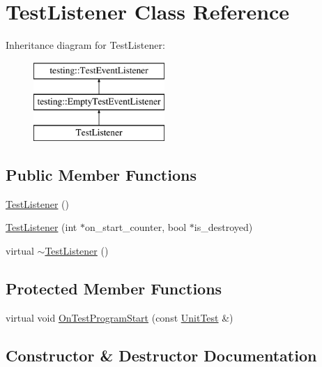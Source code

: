 \hypertarget{class_test_listener}{}\section{Test\+Listener Class Reference}
\label{class_test_listener}
Inheritance diagram for Test\+Listener\+:\begin{figure}[H]
\begin{center}
\leavevmode
\includegraphics[height=3.000000cm]{class_test_listener}
\end{center}
\end{figure}
\subsection*{Public Member Functions}
\begin{DoxyCompactItemize}
\item 
\hyperlink{class_test_listener_ae20c874ce92777371de6d024df229e9f}{Test\+Listener} ()
\item 
\hyperlink{class_test_listener_ab65604c6c3742c494e9378e770da5d42}{Test\+Listener} (int $\ast$on\+\_\+start\+\_\+counter, bool $\ast$is\+\_\+destroyed)
\item 
virtual \hyperlink{class_test_listener_ae59dec3ae673618185eebf71881902e9}{$\sim$\+Test\+Listener} ()
\end{DoxyCompactItemize}
\subsection*{Protected Member Functions}
\begin{DoxyCompactItemize}
\item 
virtual void \hyperlink{class_test_listener_a6218f522f5b6b37050ff0ea630ac5fd3}{On\+Test\+Program\+Start} (const \hyperlink{classtesting_1_1_unit_test}{Unit\+Test} \&)
\end{DoxyCompactItemize}


\subsection{Constructor \& Destructor Documentation}
\hypertarget{class_test_listener_ae20c874ce92777371de6d024df229e9f}{}
